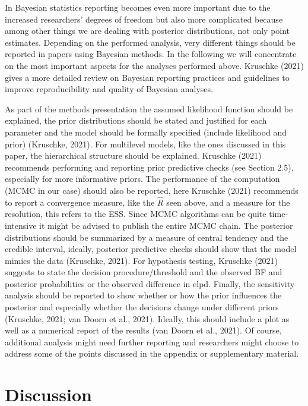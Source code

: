 \documentclass[
  doc,12pt,floatsintext]{apa7}
\begin{document}
In Bayesian statistics reporting becomes even more important due to the increased researchers' degrees of freedom but also more complicated because among other things we are dealing with posterior distributions, not only point estimates. Depending on the performed analysis, very different things should be reported in papers using Bayesian methods. In the following we will concentrate on the most important aspects for the analyses performed above. Kruschke (2021) gives a more detailed review on Bayesian reporting practices and guidelines to improve reproducibility and quality of Bayesian analyses.

As part of the methods presentation the assumed likelihood function should be explained, the prior distributions should be stated and justified for each parameter and the model should be formally specified (include likelihood and prior) (Kruschke, 2021). For multilevel models, like the ones discussed in this paper, the hierarchical structure should be explained. Kruschke (2021) recommends performing and reporting prior predictive checks (see Section 2.5), especially for more informative priors. The performance of the computation (MCMC in our case) should also be reported, here Kruschke (2021) recommends to report a convergence measure, like the \(\hat{R}\) seen above, and a measure for the resolution, this refers to the ESS. Since MCMC algorithms can be quite time-intensive it might be advised to publish the entire MCMC chain. The posterior distributions should be summarized by a measure of central tendency and the credible interval, ideally, posterior predictive checks should show that the model mimics the data (Kruschke, 2021). For hypothesis testing, Kruschke (2021) suggests to state the decision procedure/threshold and the observed BF and posterior probabilities or the observed difference in elpd. Finally, the sensitivity analysis should be reported to show whether or how the prior influences the posterior and especially whether the decisions change under different priors (Kruschke, 2021; van Doorn et al., 2021). Ideally, this should include a plot as well as a numerical report of the results (van Doorn et al., 2021). Of course, additional analysis might need further reporting and researchers might choose to address some of the points discussed in the appendix or supplementary material.

\section{Discussion}\label{discussion}
\end{document}
